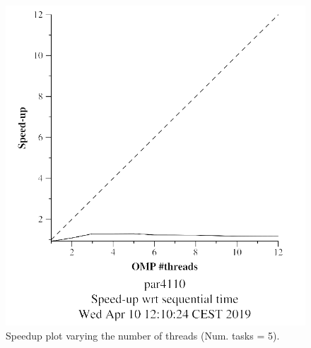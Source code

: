 \documentclass[12pt, a4paper]{article}
\begin{document}
\begin{figure}[H]
\begin{minipage}[b]{0.4\linewidth}
  \includegraphics[scale=0.5]{./mandel-omp-10000-strong-omp-3-5-speedup}
  \caption{Speedup plot varying the number of threads (Num. tasks = 5).}
  \label{fig:mandel-omp-10000-strong-omp-3-5-speedup}
\end{minipage}
\end{figure}
\end{document}
